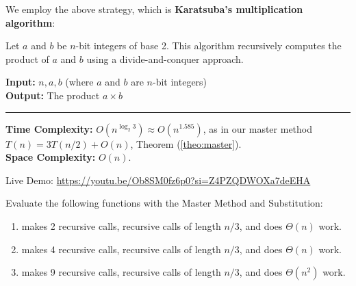 \noindent
We employ the above strategy, which is \textbf{Karatsuba's multiplication algorithm}:

\begin{Func}
    Let $a$ and $b$ be $n$-bit integers of base 2. This algorithm recursively computes the product of $a$ and $b$ using a divide-and-conquer approach.

    \vspace{.5em}
    \noindent
    \textbf{Input:} $n, a, b$ (where $a$ and $b$ are $n$-bit integers)\\
    \textbf{Output:} The product $a \times b$\\

    \begin{algorithm}[H]
        \SetAlgoLined
    \end{algorithm}
    \noindent\rule{\textwidth}{0.4pt}

    \noindent
    \textbf{Time Complexity:} $O(n^{\log_2 3}) \approx O(n^{1.585})$, as in our master method $T(n)=3T(n/2)+O(n)$, Theorem (\ref{theo:master}).\\
    \textbf{Space Complexity:} $O(n)$.
\end{Func}

\newpage

\begin{Tip}
    Live Demo: \url{https://youtu.be/Ob8SM0fz6p0?si=Z4PZQDWOXa7deEHA}
\end{Tip}

\newpage 

\begin{Exercise} Evaluate the following functions with the Master Method and Substitution:
    \begin{enumerate}
        \item makes 2 recursive calls, recursive calls of length $n/3$, and does $\Theta(n)$ work.
        \item makes 4 recursive calls, recursive calls of length $n/3$, and does $\Theta(n)$ work.
        \item makes 9 recursive calls, recursive calls of length $n/3$, and does $\Theta(n^2)$ work.
    \end{enumerate}
\end{Exercise}

